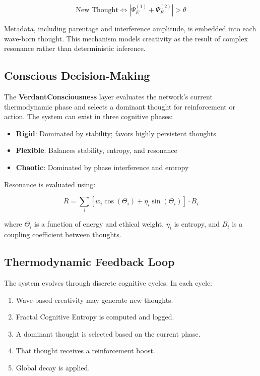 \documentclass{article}
\begin{document}
\begin{equation}
\text{New Thought} \iff |\Psi_E^{(1)} + \Psi_E^{(2)}| > \theta
\end{equation}

Metadata, including parentage and interference amplitude, is embedded into each wave-born thought. This mechanism models creativity as the result of complex resonance rather than deterministic inference.

\subsection{Conscious Decision-Making}

The \textbf{VerdantConsciousness} layer evaluates the network’s current thermodynamic phase and selects a dominant thought for reinforcement or action. The system can exist in three cognitive phases:

\begin{itemize}
    \item \textbf{Rigid}: Dominated by stability; favors highly persistent thoughts
    \item \textbf{Flexible}: Balances stability, entropy, and resonance
    \item \textbf{Chaotic}: Dominated by phase interference and entropy
\end{itemize}

Resonance is evaluated using:

\begin{equation}
R = \sum_i \left[ w_i \cos(\Theta_i) + \eta_i \sin(\Theta_i) \right] \cdot B_i
\end{equation}

\noindent where $\Theta_i$ is a function of energy and ethical weight, $\eta_i$ is entropy, and $B_i$ is a coupling coefficient between thoughts.

\subsection{Thermodynamic Feedback Loop}

The system evolves through discrete cognitive cycles. In each cycle:

\begin{enumerate}
    \item Wave-based creativity may generate new thoughts.
    \item Fractal Cognitive Entropy is computed and logged.
    \item A dominant thought is selected based on the current phase.
    \item That thought receives a reinforcement boost.
    \item Global decay is applied.
\end{enumerate}
\end{document}

